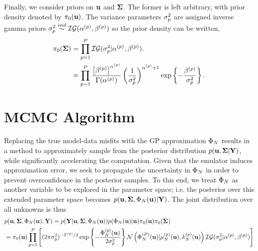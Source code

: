 \documentclass[12pt]{article}
\begin{document}
Finally, we consider priors on $\bpar$ and $\CovObs$. The former is left arbitrary, with prior density denoted by $\priorDens(\bpar)$. 
The variance parameters $\sdObs_{\objIdx}^2$ are assigned inverse gamma priors $\sdObs_{\objIdx}^2 \overset{ind}{\sim} \mathcal{IG}(\indexObj{\IGShape}, \indexObj{\IGScale})$ so the
prior density can be written, 
\begin{align}
\priorDens(\CovObs) 
&= \prod_{\objIdx = 1}^{\Nobj} \mathcal{IG}(\sdObs_{\objIdx}^2|\indexObj{\IGShape}, \indexObj{\IGScale}). \label{inv_gamma_prior} \\
&= \prod_{\objIdx = 1}^{\Nobj} \frac{\left[ \indexObj{\IGScale}\right]^{\indexObj{\IGShape}}}{\Gamma(\indexObj{\IGShape})} \left(\frac{1}{\sdObs^2_{\objIdx}}\right)^{\indexObj{\IGShape}+1} 
\exp\left\{-\frac{\indexObj{\IGScale}}{\sdObs^2_{\objIdx}} \right\}. \nonumber
\end{align}

\section{MCMC Algorithm}
Replacing the true model-data misfits with the GP approximation $\indexDesign[\Ndesign]{\SSR} $ results in a method to approximately sample from the posterior 
distribution $p(\bpar, \CovObs | \stateMat)$, while significantly accelerating the computation. Given that the emulator induces approximation error, we seek to 
propagate the uncertainty in $\indexDesign[\Ndesign]{\SSR}$ in order to prevent overconfidence in the posterior samples. To this end, we treat $\indexDesign[\Ndesign]{\SSR}$
as another variable to be explored in the parameter space; i.e. the posterior over this extended parameter space becomes 
$p(\bpar, \CovObs, \indexDesign[\Ndesign]{\SSR}(\bpar) | \stateMat)$. The joint distribution over all unknowns is thus 
\begin{align*}
&p(\bpar, \CovObs, \indexDesign[\Ndesign]{\SSR}(\bpar), \stateMat) = 
p(\stateMat | \bpar, \CovObs, \indexDesign[\Ndesign]{\SSR}(\bpar))p(\indexDesign[\Ndesign]{\SSR}(\bpar) | \bpar) \priorDens(\bpar) \priorDens(\CovObs) \\
&= \priorDens(\bpar) \prod_{\objIdx=1}^{\Nobj} \left[(2\pi\sdObs^2_{\objIdx})^{-\indexObj{\Ntime}/2} \exp\left\{-\frac{\SSRVecPredOut{\Ndesign}{\objIdx}(\bpar)}{2\sdObs^2_{\objIdx}} \right\} 
\Gaussian\left(\SSRVecPredOut{\Ndesign}{\Nobj}(\bpar) | \GPMeanPredOut{\Ndesign}{\objIdx}(\bpar), \GPKerPredOut{\Ndesign}{\objIdx}(\bpar)\right) \mathcal{IG}(\sdObs^2_{\objIdx}| \indexObj{\IGShape}, \indexObj{\IGScale}) \right] 
\end{align*}
\end{document}
